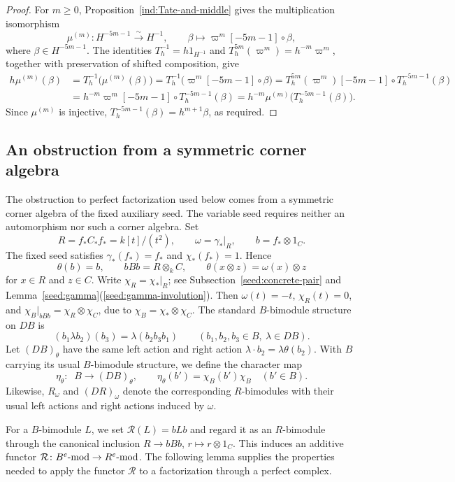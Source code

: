 \documentclass[11pt]{article}
\begin{document}
\begin{proof}
For $m\ge0$, Proposition~\ref{ind:Tate-and-middle} gives the
multiplication isomorphism
\[
 \mu^{(m)}:H^{-5m-1}\xrightarrow{\sim}H^{-1},\qquad
 \beta\longmapsto\varpi^m[-5m-1]\circ\beta,
\]
where $\beta\in H^{-5m-1}$. The identities
$T_h^{-1}=h1_{H^{-1}}$ and
$T_h^{5m}(\varpi^m)=h^{-m}\varpi^m$, together with preservation
of shifted composition, give
\[
 \begin{aligned}
 h\mu^{(m)}(\beta)
 &=T_h^{-1}\bigl(\mu^{(m)}(\beta)\bigr)
  =T_h^{-1}\bigl(\varpi^m[-5m-1]\circ\beta\bigr)
  =T_h^{5m}(\varpi^m)[-5m-1]\circ T_h^{-5m-1}(\beta)\\
 &=h^{-m}\varpi^m[-5m-1]\circ T_h^{-5m-1}(\beta)
  =h^{-m}\mu^{(m)}\bigl(T_h^{-5m-1}(\beta)\bigr).
 \end{aligned}
\]
Since $\mu^{(m)}$ is injective,
$T_h^{-5m-1}(\beta)=h^{m+1}\beta$, as required.
\end{proof}

\subsection{An obstruction from a symmetric corner algebra}

The obstruction to perfect factorization used below comes from a
symmetric corner algebra of the fixed auxiliary seed. The variable seed
requires neither an automorphism nor such a corner algebra. Set
\[
 R=f_*C_*f_*=k[t]/(t^2),\qquad
 \omega=\gamma_*|_R,\qquad b=f_*\otimes1_C.
\]
The fixed seed satisfies $\gamma_*(f_*)=f_*$ and
$\chi_*(f_*)=1$. Hence
$$\theta(b)=b,\qquad bBb=R\otimes_k C, \qquad
\theta(x\otimes z)=\omega(x)\otimes z$$ for $x\in R$ and $z\in C$.
Write $\chi_R=\chi_*|_R$; see Subsection~\ref{seed:concrete-pair} and
Lemma~\ref{seed:gamma}\textup{(\ref{seed:gamma-involution})}. Then $\omega(t)=-t$,
$\chi_R(t)=0$, and $\chi_B|_{bBb}=\chi_R\otimes\chi_C$, due to $\chi_B=\chi_*\otimes\chi_C$.
The standard $B$-bimodule structure on $DB$ is
\[
 (b_1\lambda b_2)(b_3)=\lambda(b_2b_3b_1)
 \qquad(b_1, b_2, b_3\in B,\ \lambda\in DB).
\]
Let $(DB)_\theta$ have the same left action and right action $\lambda\cdot b_2=\lambda\theta(b_2)$.
With $B$ carrying its usual $B$-bimodule structure, we define the character map
\[
 \eta_\theta:\;\;B\longrightarrow(DB)_\theta,\qquad
 \eta_\theta(b')=\chi_B(b')\chi_B\quad(b'\in B).
\]
Likewise, $R_\omega$ and $(DR)_\omega$ denote the corresponding
$R$-bimodules with their usual left actions and right actions
induced by $\omega$.

For a $B$-bimodule $L$, we set $\mathcal R(L)=bLb$ and regard it as an
$R$-bimodule through the canonical inclusion $R\to bBb$, $r\mapsto r\otimes1_C$.
This induces an additive functor
$\mathcal R\colon B^e\mbox{{\rm -mod}}\to R^e\mbox{{\rm -mod}}$.
The following lemma supplies the properties needed to apply the functor $\mathcal R$ to a factorization through a perfect complex.
\end{document}

